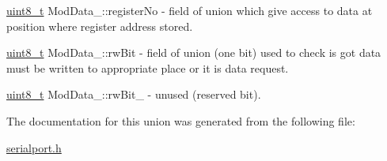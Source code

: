 \mbox{\label{unionModData___acf7fca8058f75c693373e96038158eb8}} 
{\footnotesize\ttfamily \mbox{\hyperlink{settings_8h_a48091a1e52849b0871df2f7081be2e38}{uint8\+\_\+t}} Mod\+Data\+\_\+\+::\texorpdfstring{register\+No}{registerNo}} - field of union which give access to data at position where register address stored.

\mbox{\label{unionModData___ace1455957fe106915d531b3f37c991dd}} 
{\footnotesize\ttfamily \mbox{\hyperlink{settings_8h_a48091a1e52849b0871df2f7081be2e38}{uint8\+\_\+t}} Mod\+Data\+\_\+\+::\texorpdfstring{rw\+Bit}{rwBit}} - field of union (one bit) used to check is got data must be written to appropriate place or it is data request.

\mbox{\label{unionModData___aaff791ab397b823d20298f3ef7ae37a8}} 
{\footnotesize\ttfamily \mbox{\hyperlink{settings_8h_a48091a1e52849b0871df2f7081be2e38}{uint8\+\_\+t}} Mod\+Data\+\_\+\+::\texorpdfstring{rw\+Bit\+\_\+}{rwBit\_}} - unused (reserved bit).



The documentation for this union was generated from the following file\+:\begin{DoxyCompactItemize}
\item 
\mbox{\hyperlink{serialport_8h}{serialport.\+h}}\end{DoxyCompactItemize}
\newpage